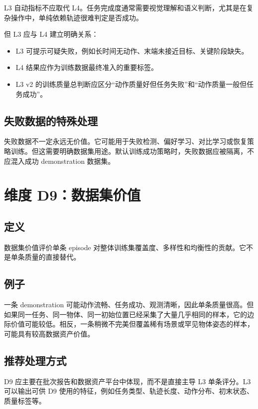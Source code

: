 \documentclass[UTF8,zihao=-4]{ctexart}
\begin{document}
L3 自动指标不应取代 L4。任务完成度通常需要视觉理解和语义判断，尤其是在复杂操作中，单纯依赖轨迹很难判定是否成功。

但 L3 应与 L4 建立明确关系：

\begin{itemize}
  \item L3 可提示可疑失败，例如长时间无动作、末端未接近目标、关键阶段缺失。
  \item L4 结果应作为训练数据最终准入的重要标签。
  \item L3 v2 的训练质量总判断应区分“动作质量好但任务失败”和“动作质量一般但任务成功”。
\end{itemize}

\subsection{失败数据的特殊处理}

失败数据不一定永远无价值。它可能用于失败检测、偏好学习、对比学习或恢复策略训练。但这需要明确数据集用途。默认训练成功策略时，失败数据应被隔离，不应混入成功 demonstration 数据集。

\section{维度 D9：数据集价值}

\subsection{定义}

数据集价值评价单条 episode 对整体训练集覆盖度、多样性和均衡性的贡献。它不是单条质量的直接替代。

\subsection{例子}

一条 demonstration 可能动作流畅、任务成功、观测清晰，因此单条质量很高。但如果同一任务、同一物体、同一初始位置已经采集了大量几乎相同的样本，它的边际价值可能较低。相反，一条稍微不完美但覆盖稀有场景或罕见物体姿态的样本，可能具有较高数据资产价值。

\subsection{推荐处理方式}

D9 应主要在批次报告和数据资产平台中体现，而不是直接主导 L3 单条评分。L3 可以输出可供 D9 使用的特征，例如任务类型、轨迹长度、动作分布、初末状态、质量标签等。
\end{document}
